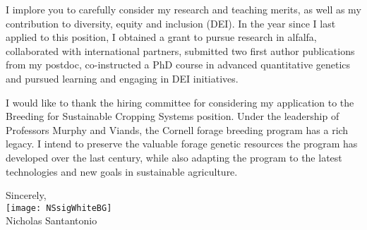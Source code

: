 \documentclass[11pt, letterpaper]{moderncv}
\begin{document}
I implore you to carefully consider my research and teaching merits, as well as my contribution to diversity, equity and inclusion (DEI). In the year since I last applied to this position, I obtained a grant to pursue research in alfalfa, collaborated with international partners, submitted two first author publications from my postdoc, co-instructed a PhD course in advanced quantitative genetics and pursued learning and engaging in DEI initiatives. 

I would like to thank the hiring committee for considering my application to the Breeding for Sustainable Cropping Systems position. Under the leadership of Professors Murphy and Viands, the Cornell forage breeding program has a rich legacy. I intend to preserve the valuable forage genetic resources the program has developed over the last century, while also adapting the program to the latest technologies and new goals in sustainable agriculture.

\bigskip

Sincerely,\\
\texttt{[image: NSsigWhiteBG]}\\
Nicholas Santantonio
\end{document}
